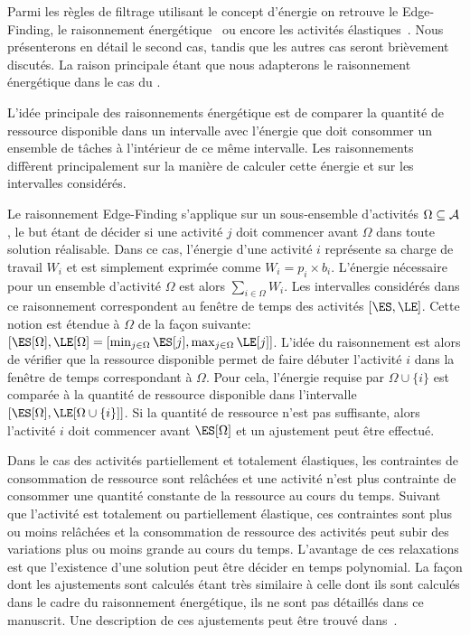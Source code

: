 Parmi les règles de filtrage utilisant le concept d'énergie on
retrouve le Edge-Finding\cite{VilimEF,theseNuijten}, le raisonnement
énergétique~\cite{RELopez} ou encore les activités
élastiques~\cite{BLPN}.  Nous présenterons en détail le second cas,
tandis que les autres cas seront brièvement discutés. La raison
principale étant que nous adapterons le raisonnement énergétique dans
le cas du \CECSP.

L'idée principale des raisonnements énergétique est de comparer la
quantité de ressource disponible dans un intervalle avec l'énergie que
doit consommer un ensemble de tâches à l'intérieur de ce même
intervalle. Les raisonnements diffèrent principalement sur la manière
de calculer cette énergie et sur les intervalles considérés. 

 Le raisonnement Edge-Finding s'applique sur un sous-ensemble
d'activités $\Omega \subseteq {\cal A}$, le but étant de décider si une
activité $j$ doit commencer avant $\Omega$ dans toute solution
réalisable. Dans ce cas, l'énergie d'une activité $i$ représente sa
charge de travail $W_i$ et est simplement exprimée comme
$W_i=p_i\times b_i$. L'énergie nécessaire pour un ensemble d'activité
$\Omega$ est alors $\sum_{i\in \Omega} W_i$. Les intervalles
considérés dans ce raisonnement correspondent au fenêtre de temps des
activités $[\ES,\LE]$. Cette notion est étendue à $\Omega$ de la façon
suivante: $[\ES[\Omega],\LE[\Omega]=[\min_{j \in \Omega}\ES[j],\max_{j
\in \Omega} \LE[j] ]$. L'idée du raisonnement est alors  de vérifier
que la ressource disponible permet de faire débuter l'activité $i$
dans la fenêtre de temps correspondant à $\Omega$. Pour cela,
l'énergie requise par $\Omega \cup \{ i\}$ est comparée à la quantité
de ressource disponible dans l'intervalle $[\ES[\Omega],\LE[\Omega\cup
\{i\}]]$. Si la quantité de ressource n'est pas suffisante, alors
l'activité $i$ doit commencer avant $\ES[\Omega]$ et un ajustement
peut être effectué.

Dans le cas des activités partiellement et totalement élastiques, les
contraintes de consommation de ressource sont relâchées et une
activité n'est plus contrainte de consommer une quantité constante de
la ressource au cours du temps. Suivant que l'activité est totalement
ou partiellement élastique, ces contraintes sont plus ou moins
relâchées et la consommation de ressource des activités peut subir des
variations plus ou moins grande au cours du temps. L'avantage de ces
relaxations est que l'existence d'une solution peut être décider en
temps polynomial. La façon dont les ajustements sont calculés étant
très similaire à celle dont ils sont calculés dans le cadre du
raisonnement énergétique, ils ne sont pas détaillés dans ce
manuscrit. Une description de ces ajustements peut être trouvé
dans~\cite{BLN}. 

